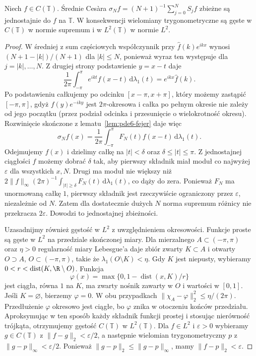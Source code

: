 \begin{twierdzenie}
\label{thm:pde6-fejer}
Niech $f\in C(\mathbb T)$. Średnie Cesàra
$\sigma_N f=(N+1)^{-1}\sum_{j=0}^N S_jf$
zbieżne są jednostajnie do $f$ na $\mathbb T$.
W konsekwencji wielomiany trygonometryczne są gęste
w $C(\mathbb T)$ w normie supremum i w $L^2(\mathbb T)$
w normie $L^2$.
\end{twierdzenie}
\begin{proof}
W średniej z sum częściowych współczynnik
przy $\widehat f(k)e^{ikx}$ wynosi
$(N+1-|k|)/(N+1)$ dla $|k|\leq N$, ponieważ
wyraz ten występuje dla $j=|k|,\ldots,N$.
Z drugiej strony podstawienie $y=x-t$ daje
\[
 \frac1{2\pi}\int_{-\pi}^{\pi}e^{ikt}f(x-t)\,
 \mathrm d\lambda_1(t)=e^{ikx}\widehat f(k).
\]
Po podstawieniu całkujemy po odcinku
$[x-\pi,x+\pi]$, który możemy zastąpić
$[-\pi,\pi]$, gdyż $f(y)e^{-iky}$ jest
$2\pi$-okresowa i całka po pełnym okresie
nie zależy od jego początku (przez podział
odcinka i przesunięcie o wielokrotność okresu).
Rozwinięcie skończone z lematu~\ref{lem:pde6-fejer}
daje więc
\[
 \sigma_Nf(x)=\frac1{2\pi}\int_{-\pi}^{\pi}
 F_N(t)f(x-t)\,\mathrm d\lambda_1(t).
\]
Odejmujemy $f(x)$ i dzielimy całkę na $|t|<\delta$
oraz $\delta\le|t|\le\pi$. Z jednostajnej ciągłości $f$
możemy dobrać $\delta$ tak, aby pierwszy składnik
miał moduł co najwyżej $\varepsilon$ dla wszystkich $x,N$.
Drugi ma moduł nie większy niż
$2\|f\|_\infty(2\pi)^{-1}\int_{|t|\ge\delta}F_N(t)
\,\mathrm d\lambda_1(t)$, co dąży do zera.
Ponieważ $F_N$ ma unormowaną całkę $1$, pierwszy
składnik jest rzeczywiście ograniczony przez
$\varepsilon$, niezależnie od $N$. Zatem dla
dostatecznie dużych $N$ norma supremum różnicy
nie przekracza $2\varepsilon$. Dowodzi to
jednostajnej zbieżności.

Uzasadnijmy również gęstość w $L^2$ z uwzględnieniem
okresowości. Funkcje proste są gęste w $L^2$
na przedziale skończonej miary. Dla mierzalnego
$A\subset(-\pi,\pi)$ oraz $\eta>0$ regularność
miary Lebesgue'a daje zbiór zwarty $K\subset A$
i otwarty $O\supset A$, $O\subset(-\pi,\pi)$,
takie że $\lambda_1(O\setminus K)<\eta$.
Gdy $K$ jest niepusty, wybieramy
$0<r<\operatorname{dist}(K,\R\setminus O)$.
Funkcja
\[
 \varphi(x)=\max\{0,1-\operatorname{dist}(x,K)/r\}
\]
jest ciągła, równa $1$ na $K$, ma zwarty nośnik
zawarty w $O$ i wartości w $[0,1]$.
Jeśli $K=\varnothing$, bierzemy $\varphi=0$.
W obu przypadkach
$\|\chi_A-\varphi\|_2^2\leq\eta/(2\pi)$.
Przedłużenie $\varphi$ okresowo jest ciągłe,
bo $\varphi$ znika w otoczeniu końców przedziału.
Aproksymując w ten sposób każdy składnik
funkcji prostej i stosując nierówność trójkąta,
otrzymujemy gęstość $C(\mathbb T)$ w $L^2(\mathbb T)$.
Dla $f\in L^2$ i $\varepsilon>0$ wybieramy
$g\in C(\mathbb T)$ z $\|f-g\|_2<\varepsilon/2$,
a następnie wielomian trygonometryczny $p$
z $\|g-p\|_\infty<\varepsilon/2$.
Ponieważ $\|g-p\|_2\leq\|g-p\|_\infty$,
mamy $\|f-p\|_2<\varepsilon$.
\end{proof}

